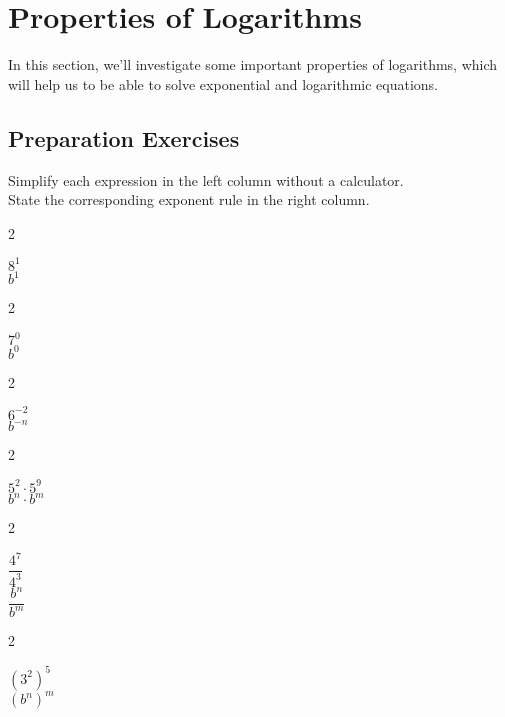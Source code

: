 
\section{Properties of Logarithms} \label{logarithms-properties}

In this section, we'll investigate some important properties of logarithms, which will help us to be able to solve exponential and logarithmic equations. \\[0.5em]

\subsection*{Preparation Exercises} \label{prep-logarithms-properties}

\begin{myPrep}
Simplify each expression in the left column without a calculator.  \\
State the corresponding exponent rule in the right column.
	\begin{enumerate}
		\vfill

		\vfill

		\vfill

		\vfill

		\vfill
		
		\vfill
	\end{enumerate}
\end{myPrep}

